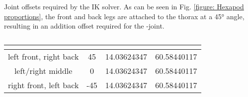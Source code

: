 Joint offsets required by the IK solver. 
As can be seen in Fig. \ref{figure: Hexapod proportions}, the front and back legs are attached to the thorax at a 45° angle, resulting in an addition offset required for the \textalpha-joint.
{\def\arraystretch{1.4}\tabcolsep=5pt
	\begin{table}
		\centering
		\begin{tabular}{| c | c | c | c |} 
			\hline
			& \textbf{\textalpha} & \textbf{\textbeta} & \textbf{\textgamma} \\ [0.5ex] 
			\hline
			\hline
			left front, right back & 45 & 14.03624347 & 60.58440117  \\ 
			
			left/right middle & 0 & 14.03624347 & 60.58440117 \\
			
			right front, left back & -45 & 14.03624347 & 60.58440117 \\
			\hline
		\end{tabular}
		\caption[Joint position offsets]{}
		\label{table:Joint position offsets}
	\end{table}
}





